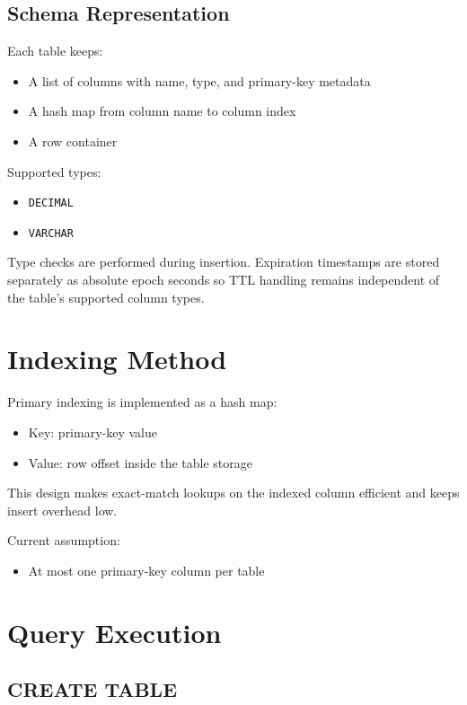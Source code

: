 \documentclass[11pt,a4paper]{article}
\begin{document}
\subsection{Schema Representation}

Each table keeps:

\begin{itemize}
    \item A list of columns with name, type, and primary-key metadata
    \item A hash map from column name to column index
    \item A row container
\end{itemize}

Supported types:

\begin{itemize}
    \item \texttt{DECIMAL}
    \item \texttt{VARCHAR}
\end{itemize}

Type checks are performed during insertion. Expiration timestamps are stored separately as absolute epoch seconds so TTL handling remains independent of the table's supported column types.

\section{Indexing Method}

Primary indexing is implemented as a hash map:

\begin{itemize}
    \item Key: primary-key value
    \item Value: row offset inside the table storage
\end{itemize}

This design makes exact-match lookups on the indexed column efficient and keeps insert overhead low.

Current assumption:

\begin{itemize}
    \item At most one primary-key column per table
\end{itemize}

\section{Query Execution}

\subsection{CREATE TABLE}
\end{document}
